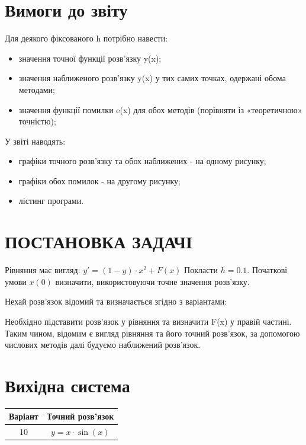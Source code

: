 \documentclass{article}
\begin{document}
    \section{Вимоги до звіту}
    Для деякого фіксованого h потрібно навести:
    \begin{itemize}
        \item значення точної функції розв’язку y(x);
        \item значення наближеного розв'язку y(x) у тих самих точках, одержані обома методами;
        \item значення функції помилки e(x) для обох методів (порівняти із «теоретичною» точністю);
    \end{itemize}
    У звіті наводять:
    \begin{itemize}
        \item графіки точного розв'язку та обох наближених - на одному рисунку;
        \item графіки обох помилок - на другому рисунку;
        \item лістинг програми.
    \end{itemize}

    \section{ПОСТАНОВКА ЗАДАЧІ}
        Рівняння має вигляд:
        $y' = (1 - y) \cdot x^2 + F(x)$
        Покласти $h = 0.1$. Початкові умови $x(0)$ визначити, використовуючи точне значення розв’язку.

        Нехай розв’язок відомий та визначається згідно з варіантами:

        Необхідно підставити розв’язок у рівняння та визначити F(x) у правій частині. Таким
        чином, відомим є вигляд рівняння та його точний розв’язок, за допомогою числових методів далі
        будуємо наближений розв’язок.

    \section{Вихідна система}
        \begin{tabular}{ |c|c| }
            \hline
            Варіант & Точний розв’язок \\ 
            \hline
            10 & $y = x \cdot \sin(x)$\\ 
            \hline
        \end{tabular}

    \newpage
\end{document}
